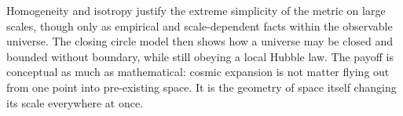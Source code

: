 Homogeneity and isotropy justify the extreme simplicity of the metric on large scales, though only as empirical and scale-dependent facts within the observable universe. The closing circle model then shows how a universe may be closed and bounded without boundary, while still obeying a local Hubble law. The payoff is conceptual as much as mathematical: cosmic expansion is not matter flying out from one point into pre-existing space. It is the geometry of space itself changing its scale everywhere at once.
